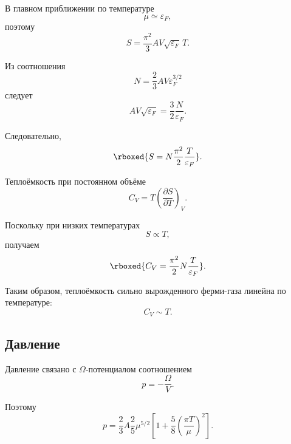 \documentclass[../final.tex]{subfiles}
\begin{document}
В главном приближении по температуре
%
\begin{equation*}
    \mu
    \simeq
    \varepsilon_F,
\end{equation*}
%
поэтому
%
\begin{equation*}
    S
    =
    \frac{\pi^2}{3}
    AV\sqrt{\varepsilon_F}\,T.
\end{equation*}

Из соотношения
%
\begin{equation*}
    N
    =
    \frac{2}{3}
    AV\varepsilon_F^{3/2}
\end{equation*}
%
следует
%
\begin{equation*}
    AV\sqrt{\varepsilon_F}
    =
    \frac{3}{2}
    \frac{N}{\varepsilon_F}.
\end{equation*}

Следовательно,
%
\[
    \rboxed{
        S
        =
        N
        \frac{\pi^2}{2}
        \frac{T}{\varepsilon_F}
    }.
\]

Теплоёмкость при постоянном объёме
%
\begin{equation*}
    C_V
    =
    T
    \left(
        \frac{\partial S}{\partial T}
    \right)_V.
\end{equation*}

Поскольку при низких температурах
%
\begin{equation*}
    S
    \propto
    T,
\end{equation*}
%
получаем
%
\[
    \rboxed{
        C_V
        =
        \frac{\pi^2}{2}
        N
        \frac{T}{\varepsilon_F}
    }.
\]

Таким образом, теплоёмкость сильно вырожденного ферми-газа линейна
по температуре:
%
\begin{equation*}
    C_V
    \sim
    T.
\end{equation*}


\subsection{Давление}

Давление связано с $\Omega$-потенциалом соотношением
%
\begin{equation*}
    p
    =
    -
    \frac{\Omega}{V}.
\end{equation*}

Поэтому
%
\begin{equation*}
    p
    =
    \frac{2}{3}A
    \frac{2}{5}
    \mu^{5/2}
    \left[
        1
        +
        \frac{5}{8}
        \left(
            \frac{\pi T}{\mu}
        \right)^2
    \right].
\end{equation*}
\end{document}
